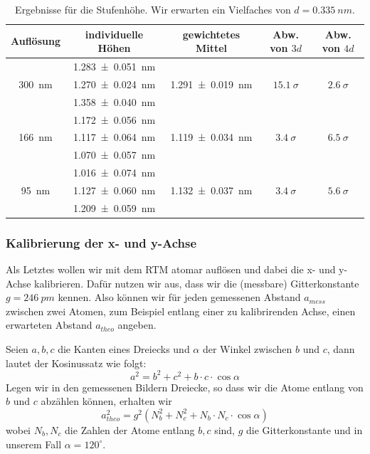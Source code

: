 \begin{table}[H]
	\renewcommand{\arraystretch}{1.5}
	\centering
	\begin{tabular}{|c|c|c|c|c|}
		\hline
		Auflösung & individuelle Höhen & gewichtetes Mittel & Abw. von $3d$ & Abw. von $4d$\\
		\hline
		\multirow{3}{*}{\SI{300}{nm}} & \SI{1.283+-0.051}{nm} & \multirow{3}{*}{\SI{1.291+-0.019}{nm}} & \multirow{3}{*}{$\SI{15,1}{\sigma}$} & \multirow{3}{*}{$\SI{2,6}{\sigma}$} \\
		 & \SI{1.270+-0.024}{nm} & & & \\
		 & \SI{1.358+-0.040}{nm} & & & \\
		\hline
		\multirow{3}{*}{\SI{166}{nm}} & \SI{1.172+-0.056}{nm} & \multirow{3}{*}{\SI{1,119+-0,034}{nm}} & \multirow{3}{*}{$\SI{3,4}{\sigma}$} & \multirow{3}{*}{$\SI{6,5}{\sigma}$} \\
		 & \SI{1.117+-0.064}{nm} & & & \\
		 & \SI{1.070+-0.057}{nm} & & & \\
		\hline
		\multirow{3}{*}{\SI{95}{nm}} & \SI{1.016+-0.074}{nm} & \multirow{3}{*}{\SI{1,132+-0,037}{nm}} & \multirow{3}{*}{$\SI{3,4}{\sigma}$} & \multirow{3}{*}{$\SI{5,6}{\sigma}$} \\
		 & \SI{1.127+-0.060}{nm} & & & \\
		 & \SI{1.209+-0.059}{nm} & & & \\
		\hline
	\end{tabular}
	\caption{Ergebnisse für die Stufenhöhe. Wir erwarten ein Vielfaches von $d = \SI{0,335}{nm}$.}
	\label{tab:heights}
\end{table}

\subsubsection{Kalibrierung der x- und y-Achse}

Als Letztes wollen wir mit dem RTM atomar auflösen und dabei die x- und y-Achse kalibrieren. Dafür nutzen wir aus, dass wir die (messbare) Gitterkonstante $g = \SI{246}{pm}$ kennen. Also können wir für jeden gemessenen Abstand $a_{mess}$ zwischen zwei Atomen, zum Beispiel entlang einer zu kalibrirenden Achse, einen erwarteten Abstand $a_{theo}$ angeben.

Seien $a, b, c$ die Kanten eines Dreiecks und $\alpha$ der Winkel zwischen $b$ und $c$, dann lautet der Kosinussatz wie folgt:
\begin{equation}
a^2 = b^2 + c^2 + b \cdot c \cdot \cos\alpha
\end{equation}
Legen wir in den gemessenen Bildern Dreiecke, so dass wir die Atome entlang von $b$ und $c$ abzählen können, erhalten wir
\begin{equation}
a_{theo}^2 = g^2 (N_b^2 + N_c^2 + N_b \cdot N_c \cdot \cos\alpha)
\end{equation}
wobei $N_b, N_c$ die Zahlen der Atome entlang $b, c$ sind, $g$ die Gitterkonstante und in unserem Fall $\alpha = 120^{\circ}$.

